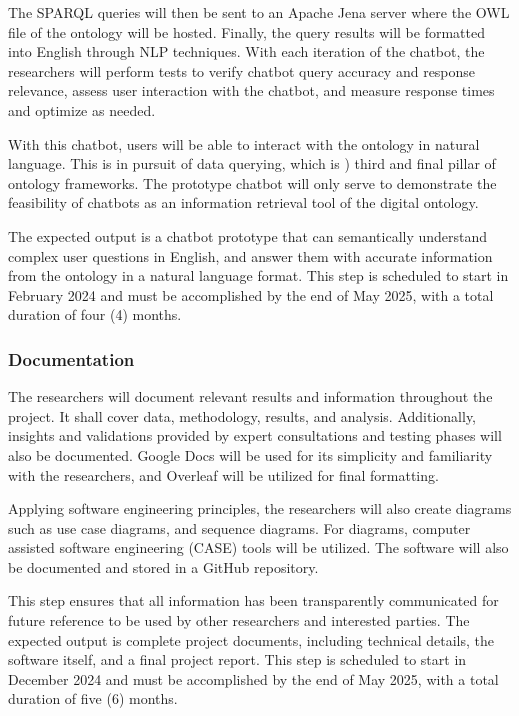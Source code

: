     The SPARQL queries will then be sent to an Apache Jena server where the OWL file of the ontology will be hosted. Finally, the query results will be formatted into English through NLP techniques. With each iteration of the chatbot, the researchers will perform tests to verify chatbot query accuracy and response relevance, assess user interaction with the chatbot, and measure response times and optimize as needed.

    With this chatbot, users will be able to interact with the ontology in natural language. This is in pursuit of data querying, which is ) third and final pillar of ontology frameworks. The prototype chatbot will only serve to demonstrate the feasibility of chatbots as an information retrieval tool of the digital ontology.

    The expected output is a chatbot prototype that can semantically understand complex user questions in English, and answer them with accurate information from the ontology in a natural language format. This step is scheduled to start in February 2024 and must be accomplished by the end of May 2025, with a total duration of four (4) months.

\subsubsection{Documentation}

    The researchers will document relevant results and information throughout the project. It shall cover  data, methodology, results, and analysis. Additionally, insights and validations provided by expert consultations and testing phases will also be documented. Google Docs will be used for its simplicity and familiarity with the researchers, and Overleaf will be utilized for final formatting. 
    
    Applying software engineering principles, the researchers will also create diagrams such as use case diagrams, and sequence diagrams. For diagrams, computer assisted software engineering (CASE) tools will be utilized. The software will also be documented and stored in a GitHub repository.
    
    This step ensures that all information has been transparently communicated for future reference to be used by other researchers and interested parties. The expected output is complete project documents, including technical details, the software itself, and a final project report. This step is scheduled to start in December 2024 and must be accomplished by the end of May 2025, with a total duration of five (6) months.

